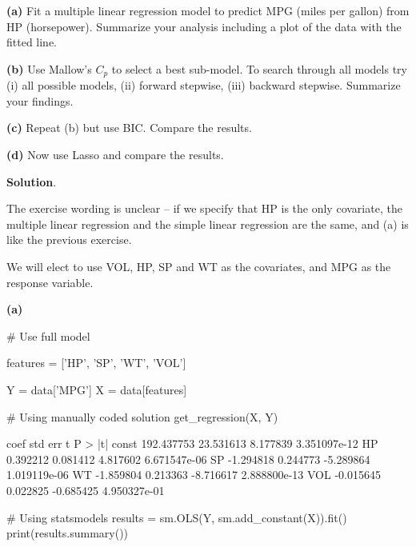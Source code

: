 \textbf{(a)} Fit a multiple linear regression model to predict MPG
(miles per gallon) from HP (horsepower). Summarize your analysis
including a plot of the data with the fitted line.

\textbf{(b)} Use Mallow's \(C_p\) to select a best sub-model. To search
through all models try (i) all possible models, (ii) forward stepwise,
(iii) backward stepwise. Summarize your findings.

\textbf{(c)} Repeat (b) but use BIC. Compare the results.

\textbf{(d)} Now use Lasso and compare the results.

\textbf{Solution}.

The exercise wording is unclear -- if we specify that HP is the only
covariate, the multiple linear regression and the simple linear
regression are the same, and (a) is like the previous exercise.

We will elect to use VOL, HP, SP and WT as the covariates, and MPG as
the response variable.

\textbf{(a)}

\begin{python}
# Use full model

features = ['HP', 'SP', 'WT', 'VOL']

Y = data['MPG']
X = data[features]
\end{python}

\begin{python}
# Using manually coded solution
get_regression(X, Y)
\end{python}

\begin{console}
             coef    std err         t       P > |t|
const  192.437753  23.531613  8.177839  3.351097e-12
HP       0.392212   0.081412  4.817602  6.671547e-06
SP      -1.294818   0.244773 -5.289864  1.019119e-06
WT      -1.859804   0.213363 -8.716617  2.888800e-13
VOL     -0.015645   0.022825 -0.685425  4.950327e-01
\end{console}
        
\begin{python}
# Using statsmodels
results = sm.OLS(Y, sm.add_constant(X)).fit()
print(results.summary())
\end{python}

